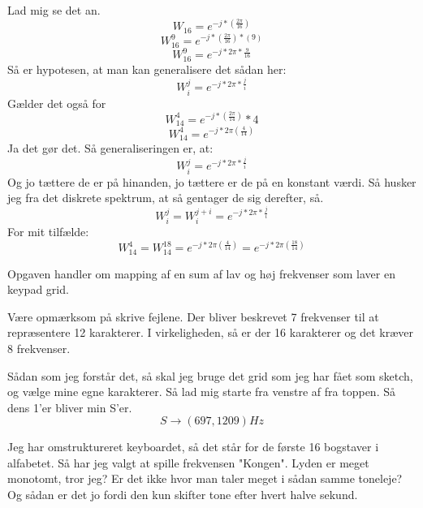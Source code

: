 \begin{Opgaver}
\begin{kapitel}
\begin{Opgave}
\begin{UnderOpgave}
            \end{UnderOpgave}
            \begin{UnderOpgave}
                Lad mig se det an. 
                \[W_{16} = e^{-j * (\frac{2\pi}{16})}\]
                \[W_{16}^9 = e^{-j * (\frac{2\pi}{16}) * (9)}\]
                \[W_{16}^9 = e^{-j * 2\pi * \frac{9}{16}}\]
                Så er hypotesen, at man kan generalisere det sådan her: 
                \[W_i^j = e^{-j * 2\pi * \frac{j}{i}}\]
                Gælder det også for
                \[W_{14}^4 = e^{-j * (\frac{2\pi}{14})} * 4\]
                \[W_{14}^4 = e^{-j * 2\pi (\frac{4}{14})}\]
                Ja det gør det. Så generaliseringen er, at: 
                \[W_i^j = e^{-j * 2\pi * \frac{j}{i}}\]
                Og jo tættere de er på hinanden, jo tættere er de på en konstant værdi. 
                Så husker jeg fra det diskrete spektrum, at så gentager de sig derefter, så. 
                \[W_i^j = W_i^{j + i} = e^{-j * 2\pi * \frac{j}{i}}\]
                For mit tilfælde: 
                \[W_{14}^4 = W_{14}^{18} = e^{-j * 2\pi (\frac{4}{14})} = e^{-j * 2\pi (\frac{18}{14})}\]
            \end{UnderOpgave}
        \end{Opgave}
        \begin{Opgave}
            Opgaven handler om mapping af en sum af lav og høj frekvenser som laver en keypad grid. \\

            Være opmærksom på skrive fejlene. Der bliver beskrevet 7 frekvenser til at repræsentere 12 karakterer. 
            I virkeligheden, så er der 16 karakterer og det kræver 8 frekvenser.
            \begin{UnderOpgave}
                Sådan som jeg forstår det, så skal jeg bruge det grid som jeg har fået som sketch, og vælge mine egne karakterer. 
                Så lad mig starte fra venstre af fra toppen. Så dens 1'er bliver min S'er. 
                \[S \rightarrow (697, 1209)Hz\]

            \end{UnderOpgave}
            \begin{UnderOpgave}
                Jeg har omstruktureret keyboardet, så det står for de første 16 bogstaver i alfabetet. 
                Så har jeg valgt at spille frekvensen "Kongen". 
                Lyden er meget monotomt, tror jeg? Er det ikke hvor man taler meget i sådan samme toneleje? 
                Og sådan er det jo fordi den kun skifter tone efter hvert halve sekund. 


\end{UnderOpgave}
\end{Opgave}
\end{kapitel}
\end{Opgaver}
